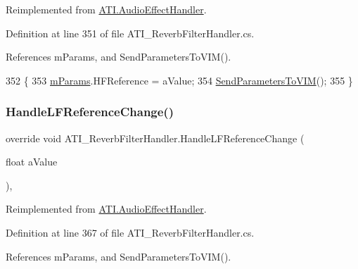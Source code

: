 Reimplemented from \hyperlink{class_a_t_i_1_1_audio_effect_handler_a183b75c93279e0d6322a0e005c590891}{A\+T\+I.\+Audio\+Effect\+Handler}.



Definition at line 351 of file A\+T\+I\+\_\+\+Reverb\+Filter\+Handler.\+cs.



References m\+Params, and Send\+Parameters\+To\+V\+I\+M().


\begin{DoxyCode}
352     \{
353         \hyperlink{class_a_t_i___reverb_filter_handler_a034260fbce2052b42bceddc891632347}{mParams}.HFReference = aValue;
354         \hyperlink{class_a_t_i___reverb_filter_handler_aacb469dc3038fca616d638f6a5a04a30}{SendParametersToVIM}();
355     \}
\end{DoxyCode}
\mbox{\label{class_a_t_i___reverb_filter_handler_abf697e814be89c3bd354deaccb237746}} 
\subsubsection{\texorpdfstring{Handle\+L\+F\+Reference\+Change()}{HandleLFReferenceChange()}}
{\footnotesize\ttfamily override void A\+T\+I\+\_\+\+Reverb\+Filter\+Handler.\+Handle\+L\+F\+Reference\+Change (\begin{DoxyParamCaption}\item[{float}]{a\+Value }\end{DoxyParamCaption})\hspace{0.3cm}{\ttfamily [protected]}, {\ttfamily [virtual]}}



Reimplemented from \hyperlink{class_a_t_i_1_1_audio_effect_handler_a8414b47429880ba18133571c86cf14ab}{A\+T\+I.\+Audio\+Effect\+Handler}.



Definition at line 367 of file A\+T\+I\+\_\+\+Reverb\+Filter\+Handler.\+cs.



References m\+Params, and Send\+Parameters\+To\+V\+I\+M().


